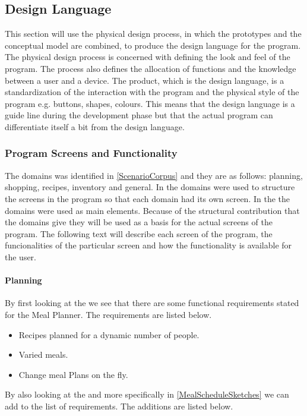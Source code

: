 \subsection{Design Language}
This section will use the physical design process, in which the prototypes and the conceptual model are combined, to produce the design language for the program. The physical design process is concerned with defining the look and feel of the program. The process also defines the allocation of functions and the knowledge between a user and a device. The product, which is the design language, is a standardization of the interaction with the program and the physical style of the program e.g. buttons, shapes, colours. This means that the design language is a guide line during the development phase but that the actual program can differentiate itself a bit from the design language.

\subsubsection{Program Screens and Functionality} \label{ScreensandFunctionality}
The domains was identified in \cref{ScenarioCorpus} and they are as follows: planning, shopping, recipes, inventory and general. In  the domains were used to structure the screens in the program so that each domain had its own screen. In the  the domains were used as main elements. Because of the structural contribution that the domains give they will be used as a basis for the actual screens of the program. The following text will describe each screen of the program, the funcionalities of the particular screen and how the functionality is available for the user.

\paragraph{Planning}
By first looking at the  we see that there are some functional requirements stated for the Meal Planner. The requirements are listed below.

\begin{itemize}
\item Recipes planned for a dynamic number of people.
\item Varied meals.
\item Change meal Plans on the fly.
\end{itemize}  

By also looking at the  and more specifically in \cref{MealScheduleSketches} we can add to the list of requirements. The additions are listed below.

